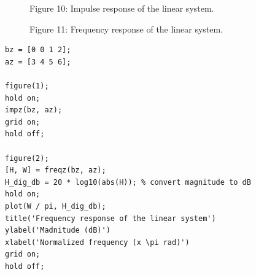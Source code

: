 \documentclass[16pt]{report}
\begin{document}
\begin{figure}
    \begin{minipage}[h]{1\linewidth}
    \caption{Figure 10: Impulse response of the linear system.}
    \label{fig:my_label}
    \end{minipage}
    \vfill
    \begin{minipage}[h]{1\linewidth}
    \caption{Figure 11: Frequency response of the linear system.}
    \label{fig:my_label}
    \end{minipage}
\end{figure}
\newpage
\begin{lstlisting}
bz = [0 0 1 2];
az = [3 4 5 6];

figure(1);
hold on;
impz(bz, az);
grid on;
hold off;

figure(2);
[H, W] = freqz(bz, az);
H_dig_db = 20 * log10(abs(H)); % convert magnitude to dB
hold on;
plot(W / pi, H_dig_db);
title('Frequency response of the linear system')
ylabel('Madnitude (dB)')
xlabel('Normalized frequency (x \pi rad)')
grid on;
hold off;


\end{lstlisting}
\end{document}
